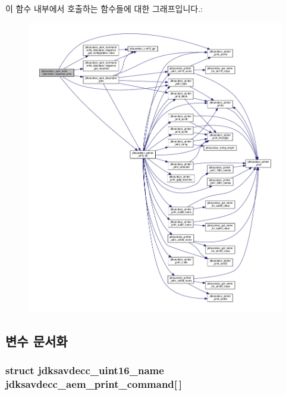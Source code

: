 이 함수 내부에서 호출하는 함수들에 대한 그래프입니다.\+:
\nopagebreak
\begin{figure}[H]
\begin{center}
\leavevmode
\includegraphics[width=350pt]{group__aem__print_ga84cff27ea7c23f1d9fdc1e953c023a80_cgraph}
\end{center}
\end{figure}




\subsection{변수 문서화}
\subsubsection[{\texorpdfstring{jdksavdecc\+\_\+aem\+\_\+print\+\_\+command}{jdksavdecc_aem_print_command}}]{\setlength{\rightskip}{0pt plus 5cm}struct {\bf jdksavdecc\+\_\+uint16\+\_\+name} jdksavdecc\+\_\+aem\+\_\+print\+\_\+command\mbox{[}$\,$\mbox{]}}\hypertarget{group__aem__print_gae7bba26850c31fa12c46c66161513148}{}\label{group__aem__print_gae7bba26850c31fa12c46c66161513148}


